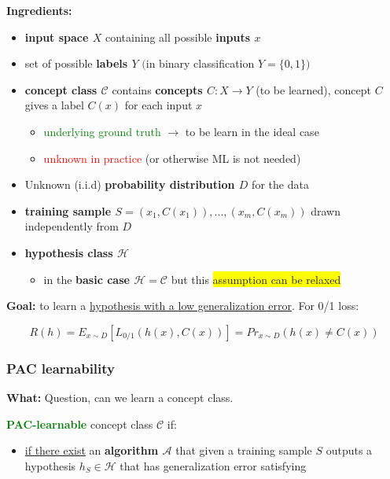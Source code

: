 \documentclass[12pt, a4paper]{article}
\begin{document}
\textbf{Ingredients:}

\begin{itemize}
  \item
    \textbf{input space $X$} containing all possible \textbf{inputs $x$}
  \item
    set of possible \textbf{labels $Y$} $($in binary
    classification $Y = \{0, 1\}$$)$
  \item
    \textbf{concept class $\mathcal{C}$} contains \textbf{concepts $C : X \rightarrow Y$} (to be learned),
    concept $C$ gives a label $C(x)$ for each input $x$
    \begin{itemize}
      \item \textcolor{Green}{underlying ground truth} $\rightarrow$ to be learn in the ideal case
      \item \textcolor{Red}{unknown in practice} (or otherwise ML is not needed)
    \end{itemize}
  \item Unknown (i.i.d) \textbf{probability distribution $D$} for the data
  \item \textbf{training sample $S = (x_1,C(x_1)),...,(x_m,C(x_m))$} drawn independently from $D$
  \item \textbf{hypothesis class $\mathcal{H}$}
  \begin{itemize}
    \item in the \textbf{basic case $\mathcal{H} = \mathcal{C}$} but this \colorbox{Yellow}{assumption can be relaxed}
  \end{itemize}
\end{itemize}

\textbf{Goal:} to learn a \uline{hypothesis with a low generalization error}. For 0/1 loss:

\[R(h) = E_{x \sim D} [L_{0/1}(h(x), C(x))] = Pr_{x \sim D} (h(x) \neq C(x))\]





\subsubsection{PAC learnability
}\label{pac-learnability}

\textbf{What:} Question, can we learn a concept class.

\bigskip \bigskip

\textbf{\textcolor{Green}{PAC-learnable}} concept class $\mathcal{C}$ if:

\begin{itemize}
  \item
     \uline{if there exist} an \textbf{algorithm $\mathcal{A}$} that given a training sample $S$ outputs a hypothesis $h_S \in \mathcal{H}$ that has generalization error satisfying
\end{itemize}
\end{document}
